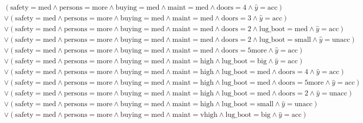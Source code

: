 \begin{scriptsize}
\[
\begin{aligned}
  & (\text{safety}=\text{med} \land \text{persons}=\text{more} \land \text{buying}=\text{med} \land \text{maint}=\text{med} \land \text{doors}=\text{4} \land \hat{y}=\text{acc})
  \\ & \lor (\text{safety}=\text{med} \land \text{persons}=\text{more} \land \text{buying}=\text{med} \land \text{maint}=\text{med} \land \text{doors}=\text{3} \land \hat{y}=\text{acc})
  \\ & \lor (\text{safety}=\text{med} \land \text{persons}=\text{more} \land \text{buying}=\text{med} \land \text{maint}=\text{med} \land \text{doors}=\text{2} \land \text{lug_boot}=\text{med} \land \hat{y}=\text{acc})
  \\ & \lor (\text{safety}=\text{med} \land \text{persons}=\text{more} \land \text{buying}=\text{med} \land \text{maint}=\text{med} \land \text{doors}=\text{2} \land \text{lug_boot}=\text{small} \land \hat{y}=\text{unacc})
  \\ & \lor (\text{safety}=\text{med} \land \text{persons}=\text{more} \land \text{buying}=\text{med} \land \text{maint}=\text{med} \land \text{doors}=\text{5more} \land \hat{y}=\text{acc})
  \\ & \lor (\text{safety}=\text{med} \land \text{persons}=\text{more} \land \text{buying}=\text{med} \land \text{maint}=\text{high} \land \text{lug_boot}=\text{big} \land \hat{y}=\text{acc})
  \\ & \lor (\text{safety}=\text{med} \land \text{persons}=\text{more} \land \text{buying}=\text{med} \land \text{maint}=\text{high} \land \text{lug_boot}=\text{med} \land \text{doors}=\text{4} \land \hat{y}=\text{acc})
  \\ & \lor (\text{safety}=\text{med} \land \text{persons}=\text{more} \land \text{buying}=\text{med} \land \text{maint}=\text{high} \land \text{lug_boot}=\text{med} \land \text{doors}=\text{5more} \land \hat{y}=\text{acc})
  \\ & \lor (\text{safety}=\text{med} \land \text{persons}=\text{more} \land \text{buying}=\text{med} \land \text{maint}=\text{high} \land \text{lug_boot}=\text{med} \land \text{doors}=\text{2} \land \hat{y}=\text{unacc})
  \\ & \lor (\text{safety}=\text{med} \land \text{persons}=\text{more} \land \text{buying}=\text{med} \land \text{maint}=\text{high} \land \text{lug_boot}=\text{small} \land \hat{y}=\text{unacc})
  \\ & \lor (\text{safety}=\text{med} \land \text{persons}=\text{more} \land \text{buying}=\text{med} \land \text{maint}=\text{vhigh} \land \text{lug_boot}=\text{big} \land \hat{y}=\text{acc})

\end{aligned}\]
\end{scriptsize}

